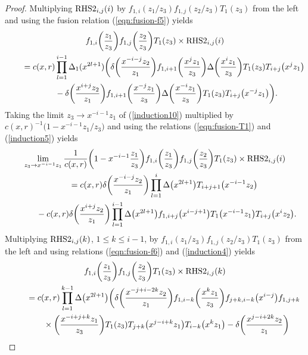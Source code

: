 \documentclass[pdftex]{sigma}
\numberwithin{equation}{section}
\begin{document}
\begin{proof}
Multiplying ${\rm RHS2}_{i,j}(i)$ by $f_{1,i}(z_1/z_3)f_{1,j}(z_2/z_3)T_1(z_3)$ from the left and using the fusion relation (\ref{eqn:fusion-f5}) yields
\begin{gather}
f_{1,i}\bigg(\frac{z_1}{z_3}\bigg)f_{1,j}\bigg(\frac{z_2}{z_3}\bigg)T_1(z_3)
\times {\rm RHS2}_{i, j}(i)\notag
\\ \qquad
{}=c(x,r)\prod_{l=1}^{i-1}\Delta_1(x^{2l+1})\bigg(\delta\bigg(\frac{x^{-i-j}z_2}{z_1}\bigg)
f_{1,i+1}\bigg(\frac{x^jz_1}{z_3}\bigg)\Delta\bigg(\frac{x^i z_1}{z_3}\bigg)T_1(z_3)T_{i+j}\big(x^jz_1\big)
\notag
\\ \qquad\hphantom{=}
{}-\delta\bigg(\frac{x^{i+j}z_2}{z_1}\bigg)f_{1,i+1}\bigg(\frac{x^{-j}z_1}{z_3}\bigg)
\Delta\bigg(\frac{x^{-i} z_1}{z_3}\bigg)T_1(z_3)T_{i+j}\big(x^{-j}z_1\big)\bigg).
\label{induction10}
\end{gather}
Taking the limit $z_3\to x^{-i-1}z_1$ of (\ref{induction10})
multiplied by $c(x,r)^{-1}\big(1-x^{-i-1}z_1/z_3\big)$
and using the relations (\ref{eqn:fusion-T1}) and (\ref{induction5}) yields
\begin{gather}
\lim_{z_3 \to x^{-i-1}z_1}\frac{1}{c(x,r)}\bigg(1-x^{-i-1}\frac{z_1}{z_3}\bigg)
f_{1,i}\bigg(\frac{z_1}{z_3}\bigg)f_{1,j}\bigg(\frac{z_2}{z_3}\bigg)T_1(z_3)
\times {\rm RHS2}_{i, j}(i)\notag
\\ \qquad
{}=c(x,r)\delta\bigg(\frac{x^{-i-j}z_2}{z_1}\bigg)\prod_{l=1}^i \Delta\big(x^{2l+1}\big)T_{i+j+1}\big(x^{-i-1}z_2\big)\notag
\\ \qquad \hphantom{=}
{}-c(x,r)\delta\bigg(\frac{x^{i+j}z_2}{z_1}\bigg)
\prod_{l=1}^{i-1} \Delta\big(x^{2l+1}\big)f_{1,i+j}\big(x^{i-j+1}\big)T_1\big(x^{-i-1}z_1\big)T_{i+j}\big(x^{i}z_2\big).
\label{induction11}
\end{gather}
Multiplying ${\rm RHS2}_{i,j}(k)$, $1\leq k \leq i-1$, by
$f_{1,i}(z_1/z_3)f_{1,j}(z_2/z_3)T_1(z_3)$
from the left and using relations (\ref{eqn:fusion-f6})
and (\ref{induction4}) yields
\begin{gather}
f_{1,i}\bigg(\frac{z_1}{z_3}\bigg)
f_{1,j}\bigg(\frac{z_2}{z_3}\bigg)T_1(z_3)
\times {\rm RHS2}_{i, j}(k)\label{induction12}
\\ \qquad
{}=c(x,r)\prod_{l=1}^{k-1}\Delta\big(x^{2l+1}\big)
\bigg(\delta\bigg(\frac{x^{-j+i-2k}z_2}{z_1}\bigg)
f_{1,i-k}\bigg(\frac{x^kz_1}{z_3}\bigg)f_{j+k,i-k}\big(x^{i-j}\big)f_{1,j+k} \notag
\\ \qquad \hphantom{=}
{}\times \bigg(\frac{x^{-i+j+k}z_1}{z_3}\bigg)
T_1(z_3)T_{j+k}\big(x^{j-i+k}z_1\big)T_{i-k}\big(x^kz_1\big)
-\delta\bigg(\frac{x^{j-i+2k}z_2}{z_1}\bigg)

\end{gather}
\end{proof}
\end{document}
